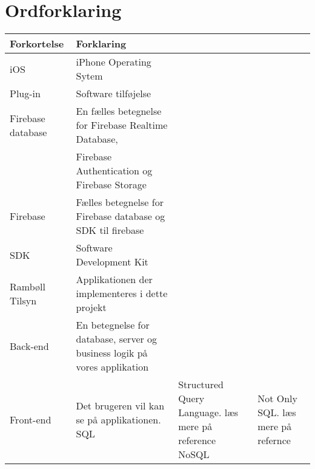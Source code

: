 \chapter*{Ordforklaring}

\begin{tabularx}{\textwidth}{l l X} \hline
	\textbf{Forkortelse}  & \textbf{Forklaring} \\ \hline
	iOS&  iPhone Operating Sytem& \\
	Plug-in&  Software tilføjelse& \\
	Firebase database& En fælles betegnelse for Firebase Realtime Database,\\
	& Firebase Authentication og Firebase Storage \\
	Firebase& Fælles betegnelse for Firebase database og SDK til firebase\\
	SDK& Software Development Kit\\
	Rambøll Tilsyn& Applikationen der implementeres i dette projekt\\
	Back-end& En betegnelse for database, server og business logik på vores applikation \\
	Front-end& Det brugeren vil kan se på applikationen. 
	SQL&  Structured Query Language. læs mere på reference\cite{SQL}
	NoSQL & Not Only SQL. læs mere på refernce \cite{NoSQL}
\end{tabularx}